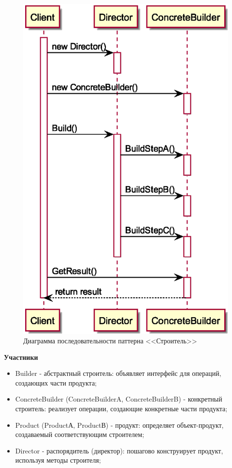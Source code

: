 \documentclass[PI,LAB]{HSEUniversity}
\begin{document}
\begin{figure}[p]
  \centering
  \includegraphics[scale=0.75]{Builder_SD.eps}
  \caption{Диаграмма последовательности паттерна <<Строитель>>}
\end{figure}
\clearpage

\textbf{Участники}
\begin{itemize}
  \item Builder - абстрактный строитель: объявляет интерфейс для операций, создающих части продукта;
  \item ConcreteBuilder (ConcreteBuilderA, ConcreteBuilderB) - конкретный строитель: реализует операции, создающие конкретные части продукта;
  \item Product (ProductА, ProductВ) - продукт: определяет объект-продукт, создаваемый соответствующим строителем;
  \item Director - распорядитель (директор): пошагово конструирует продукт, используя методы строителя;
\end{itemize}
\end{document}
